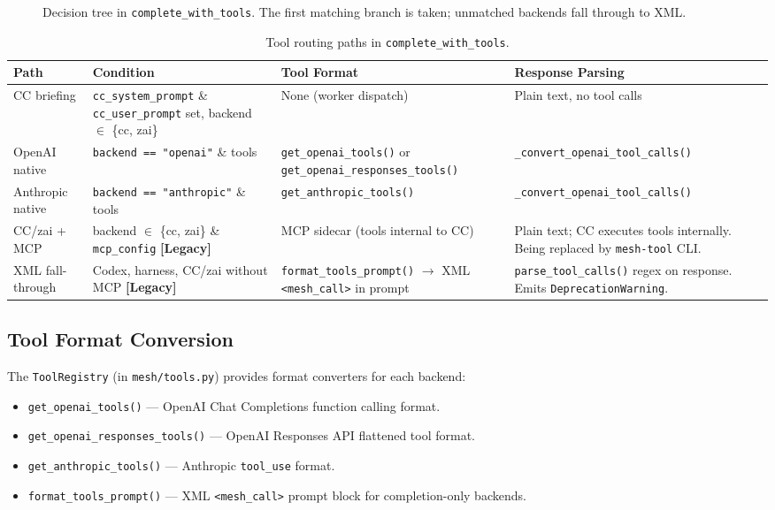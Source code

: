 \documentclass[11pt,letterpaper]{report}
\newcommand{\code}[1]{\texttt{#1}}
\begin{document}
\begin{figure}[h]
\begin{tikzpicture}
\end{tikzpicture}
\caption{Decision tree in \code{complete\_with\_tools}. The first
matching branch is taken; unmatched backends fall through to XML.}
\label{fig:dispatch}
\end{figure}

\begin{table}[h]
\centering
\small
\begin{tabular}{@{}lL{3cm}L{3.5cm}L{3.5cm}@{}}
\toprule
\textbf{Path} & \textbf{Condition} & \textbf{Tool Format} & \textbf{Response Parsing} \\
\midrule
CC briefing
  & \code{cc\_system\_prompt} \& \code{cc\_user\_prompt} set,
    backend $\in$ \{cc, zai\}
  & None (worker dispatch)
  & Plain text, no tool calls \\
\addlinespace
OpenAI native
  & \code{backend == "openai"} \& tools
  & \code{get\_openai\_tools()} or \code{get\_openai\_responses\_tools()}
  & \code{\_convert\_openai\_tool\_calls()} \\
\addlinespace
Anthropic native
  & \code{backend == "anthropic"} \& tools
  & \code{get\_anthropic\_tools()}
  & \code{\_convert\_openai\_tool\_calls()} \\
\addlinespace
CC/zai + MCP
  & backend $\in$ \{cc, zai\} \& \code{mcp\_config}
    \textbf{[Legacy]}
  & MCP sidecar (tools internal to CC)
  & Plain text; CC executes tools internally.
    Being replaced by \code{mesh-tool} CLI. \\
\addlinespace
XML fall-through
  & Codex, harness, CC/zai without MCP
    \textbf{[Legacy]}
  & \code{format\_tools\_prompt()} $\to$ XML \code{<mesh\_call>} in prompt
  & \code{parse\_tool\_calls()} regex on response.
    Emits \code{DeprecationWarning}. \\
\bottomrule
\end{tabular}
\caption{Tool routing paths in \code{complete\_with\_tools}.}
\label{tab:dispatch}
\end{table}

\subsection{Tool Format Conversion}

The \code{ToolRegistry} (in \code{mesh/tools.py}) provides format
converters for each backend:

\begin{itemize}[nosep]
  \item \code{get\_openai\_tools()} --- OpenAI Chat Completions
        function calling format.
  \item \code{get\_openai\_responses\_tools()} --- OpenAI Responses API
        flattened tool format.
  \item \code{get\_anthropic\_tools()} --- Anthropic \code{tool\_use}
        format.
  \item \code{format\_tools\_prompt()} --- XML
        \code{<mesh\_call>} prompt block for completion-only backends.
\end{itemize}
\end{document}
